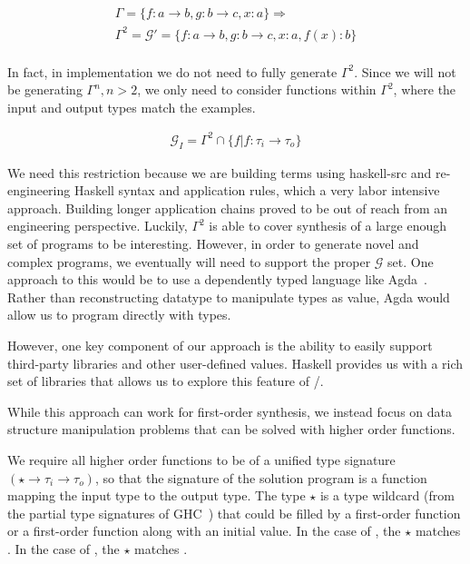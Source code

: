 \begin{gather*}
\Gamma = \{f:a\to b, g:b\to c, x:a\} \Rightarrow \\
\Gamma^2 = \mathcal{G}' = \{f:a\to b, g:b\to c, x:a, f(x):b\}\\
\end{gather*}

In fact, in implementation we do not need to fully generate $\Gamma^2$.
Since we will not be generating $\Gamma^n, n>2$, we only need to consider functions within $\Gamma^2$, where the input and output types match the examples.

\begin{gather*}
\mathcal{G}_I = \Gamma^2 \cap \{f | f : \tau_i \to \tau_o\}
\end{gather*}

We need this restriction because we are building terms using haskell-src and re-engineering Haskell syntax and application rules, which a very labor intensive approach.
Building longer application chains proved to be out of reach from an engineering perspective.
Luckily, $\Gamma^2$ is able to cover synthesis of a large enough set of programs to be interesting.
However, in order to generate novel and complex programs, we eventually will need to support the proper $\mathcal{G}$ set.
One approach to this would be to use a dependently typed language like Agda~\cite{}.
Rather than reconstructing datatype to manipulate types as value, Agda would allow us to program directly with types.

However, one key component of our approach is the ability to easily support third-party libraries and other user-defined values.
Haskell provides us with a rich set of libraries that allows us to explore this feature of \ourTool/.

While this approach can work for first-order synthesis, we instead focus on data structure manipulation problems that can be solved with higher order functions.

We require all higher order functions to be of a unified type signature $(\star \to \tau_i \to \tau_o)$, so that the signature of the solution program is a function mapping the input type to the output type. 
The type $\star$ is a type wildcard (from the partial type signatures of GHC~\cite{ghc}) that could be filled by a first-order function or a first-order function along with an initial value.
In the case of , the $\star$ matches .
In the case of , the $\star$ matches .

